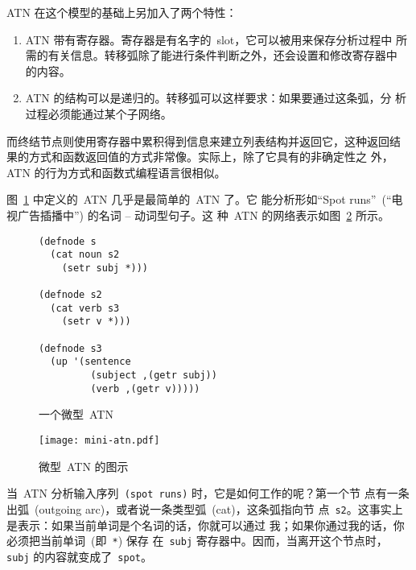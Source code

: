 \textsc{ATN} 在这个模型的基础上另加入了两个特性：

\begin{enumerate}

\item \textsc{ATN} 带有寄存器。寄存器是有名字的~slot，它可以被用来保存分析过程中
  所需的有关信息。转移弧除了能进行条件判断之外，还会设置和修改寄存器中
  的内容。

\item \textsc{ATN} 的结构可以是递归的。转移弧可以这样要求：如果要通过这条弧，分
  析过程必须能通过某个子网络。

\end{enumerate}

而终结节点则使用寄存器中累积得到信息来建立列表结构并返回它，这种返回结
果的方式和函数返回值的方式非常像。实际上，除了它具有的非确定性之
外，\textsc{ATN} 的行为方式和函数式编程语言很相似。

图~\ref{fig:a_very_small_atn} 中定义的~\textsc{ATN} 几乎是最简单的~\textsc{ATN} 了。它
能分析形如``Spot runs''~(``电视广告插播中'') 的名词 -- 动词型句子。这
种~\textsc{ATN} 的网络表示如图~\ref{fig:graph_of_a_small_atn} 所示。

\begin{figure}
\begin{lstlisting}
(defnode s
  (cat noun s2
    (setr subj *)))

(defnode s2
  (cat verb s3
    (setr v *)))

(defnode s3
  (up '(sentence
         (subject ,(getr subj))
         (verb ,(getr v)))))
\end{lstlisting}
  \caption{一个微型~ATN}
  \label{fig:a_very_small_atn}
\end{figure}

\begin{figure}
\begin{center}
\texttt{[image: mini-atn.pdf]}
\end{center}
  \caption{微型~ATN 的图示}
  \label{fig:graph_of_a_small_atn}
\end{figure}

当~\textsc{ATN} 分析输入序列~\texttt{(spot runs)} 时，它是如何工作的呢？第一个节
点有一条出弧~(outgoing arc)，或者说一条类型弧~(cat)，这条弧指向节
点~\texttt{s2}。这事实上是表示：如果当前单词是个名词的话，你就可以通过
我；如果你通过我的话，你必须把当前单词~(即~\texttt{*}) 保存
在~\texttt{subj} 寄存器中。因而，当离开这个节点时，
\verb|subj| 的内容就变成了~\verb|spot|。

